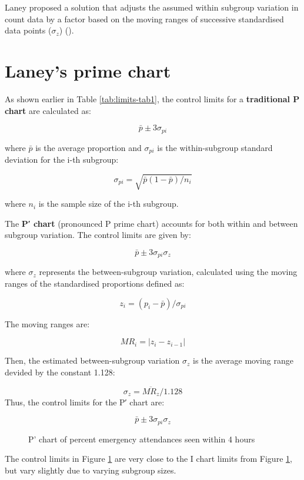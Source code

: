 \documentclass[
]{book}
\makeatletter
\newcommand*\pandocbounded[1]{%
  \sbox\pandoc@box{#1}%
  \Gscale@div\@tempa{\textheight}{\dimexpr\ht\pandoc@box+\dp\pandoc@box\relax}%
  \Gscale@div\@tempb{\linewidth}{\wd\pandoc@box}%
  \ifdim\@tempb\p@<\@tempa\p@\let\@tempa\@tempb\fi%
  \ifdim\@tempa\p@<\p@\scalebox{\@tempa}{\usebox\pandoc@box}%
  \else\usebox{\pandoc@box}%
  \fi%
}
\makeatother
\begin{document}
Laney proposed a solution that adjusts the assumed within subgroup variation in count data by a factor based on the moving ranges of successive standardised data points (\(\sigma_z\)) ().

\section{Laney's prime chart}\label{laneys-prime-chart}

As shown earlier in Table \ref{tab:limits-tab1}, the control limits for a \textbf{traditional P chart} are calculated as:

\[\bar{p}\pm3\sigma_{pi}\]

where \(\bar{p}\) is the average proportion and \(\sigma_{pi}\) is the within-subgroup standard deviation for the i-th subgroup:

\[\sigma_{pi}=\sqrt{\bar{p}(1-\bar{p})/{n_{i}}}\]

where \(n_i\) is the sample size of the i-th subgroup.

The \textbf{P′ chart} (pronounced P prime chart) accounts for both within and between subgroup variation. The control limits are given by:

\[\bar{p}\pm3\sigma_{pi}\sigma_z\]

where \(\sigma_z\) represents the between-subgroup variation, calculated using the moving ranges of the standardised proportions defined as:

\[z_i=(p_i - \bar{p})/\sigma_{pi}\]

The moving ranges are:

\[MR_i=|z_i-z_{i-1}|\]

Then, the estimated between-subgroup variation \(\sigma_z\) is the average moving range devided by the constant 1.128:

\[\sigma_z=\overline{MR_z}/1.128\]
Thus, the control limits for the P′ chart are:

\[\bar{p}\pm3\sigma_{pi}\sigma_z \]

\begin{figure}
\centering
\pandocbounded{}
\caption{\label{fig:pcharts-fig3}P' chart of percent emergency attendances seen within 4 hours}
\end{figure}

The control limits in Figure \ref{fig:pcharts-fig3} are very close to the I chart limits from Figure \ref{fig:pcharts-fig3}, but vary slightly due to varying subgroup sizes.
\end{document}
